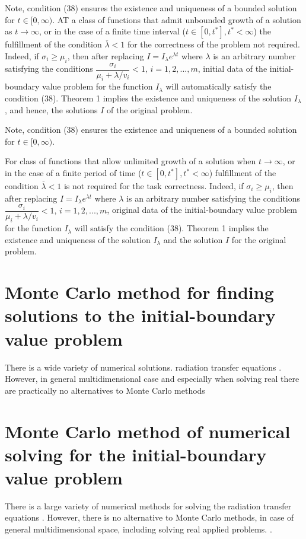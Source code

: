 \documentclass[12pt,reqno]{report}
\begin{document}
Note, condition (38) ensures the existence and
uniqueness of a bounded solution for $ t \in [0, \infty) $. 
AT a class of functions that admit unbounded growth of a solution as $ t
\to \infty $, or in the case of a finite time interval ($ t \in [0, t ^ *], t ^ * <
\infty $) the fulfillment of the condition $ \overline {\lambda} <1 $ for the correctness of the problem
not required. Indeed, if $ \sigma_i \geq \mu_i $, then after replacing $ I = I _ {\lambda} e ^ {\lambda t} $
where $ \lambda $ is an arbitrary number satisfying the conditions
$ \dfrac {\sigma_i} {\mu_i + \lambda / v_i} <1, \, i = 1,2, ..., m $,
initial data of the initial-boundary value problem for the function $ I _ {\lambda} $
will automatically satisfy the condition (38). Theorem 1 implies
the existence and uniqueness of the solution $ I _ {\lambda} $, and
hence, the solutions $ I $ of the original problem.

Note, condition (38) ensures the existence and
uniqueness of a bounded solution for $t \in [0,\infty)$.

For class of functions that allow unlimited growth of a solution when $t \to \infty$,
or in the case of a finite period of time ($t\in [0,t^*], t^* < \infty $) 
fulfillment of the condition $\overline{\lambda}<1$ is not required for the task correctness.
Indeed, if $\sigma_i \geq \mu_i$, then after replacing $I= I_{\lambda} e^{\lambda t}$
where $\lambda$ is an arbitrary number satisfying the conditions
$\dfrac{\sigma_i}{\mu_i +\lambda/v_i} < 1,\, i=1,2,...,m$,
original data of the initial-boundary value problem for the function $I_{\lambda}$
will satisfy the condition (38). Theorem 1 implies
the existence and uniqueness of the solution $I_{\lambda}$ and the solution $I$ for the original problem.

\section {Monte Carlo method for finding solutions to the initial-boundary value problem}
There is a wide variety of numerical solutions.
radiation transfer equations \cite {1,2,3,4,5,12,13,14,15,16,17,18,19}. However, in
general multidimensional case and especially when solving real
there are practically no alternatives to Monte Carlo methods

\section{Monte Carlo method of numerical solving for the initial-boundary value problem}
There is a large variety of numerical methods for solving the radiation transfer equations 
\cite{1,2,3,4,5,12,13,14,15,16,17,18,19}. However, there is no alternative to Monte Carlo methods,
in case of general multidimensional space, including solving real applied problems.
\cite{34}. 
\end{document}
